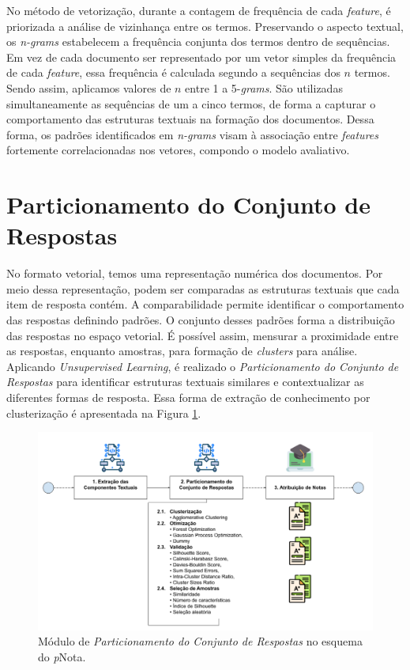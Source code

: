 No método de vetorização, durante a contagem de frequência de cada \textit{feature}, é priorizada a análise de vizinhança entre os termos. Preservando o aspecto textual, os \textit{n-grams} estabelecem a frequência conjunta dos termos dentro de sequências. Em vez de cada documento ser representado por um vetor simples da frequência de cada \textit{feature}, essa frequência é calculada segundo a sequências dos $ n $ termos. Sendo assim, aplicamos valores de $ n $ entre 1 a 5-\textit{grams}. São utilizadas simultaneamente as sequências de um a cinco termos, de forma a capturar o comportamento das estruturas textuais na formação dos documentos. Dessa forma, os padrões identificados em \textit{n-grams} \cite{spalenza2020} visam à associação entre \textit{features} fortemente correlacionadas nos vetores, compondo o modelo avaliativo.


\section{Particionamento do Conjunto de Respostas}
\label{sec-amostragem}

No formato vetorial, temos uma representação numérica dos documentos. Por meio dessa representação, podem ser comparadas as estruturas textuais que cada item de resposta contém. A comparabilidade permite identificar o comportamento das respostas definindo padrões. O conjunto desses padrões forma a distribuição das respostas no espaço vetorial. É possível assim, mensurar a proximidade entre as respostas, enquanto amostras, para formação de \textit{clusters} para análise. Aplicando \textit{Unsupervised Learning}, é realizado o \textit{Particionamento do Conjunto de Respostas} para identificar estruturas textuais similares e contextualizar as diferentes formas de resposta. Essa forma de extração de conhecimento por clusterização é apresentada na Figura \ref{fig-pcr}.

\begin{figure}[!h]
\centering
\includegraphics[width=\textwidth]{figuras/esquema-pcr-pNota.png}
\caption{Módulo de \textit{Particionamento do Conjunto de Respostas} no esquema do \textit{p}Nota.}
\label{fig-pcr}
\end{figure}

